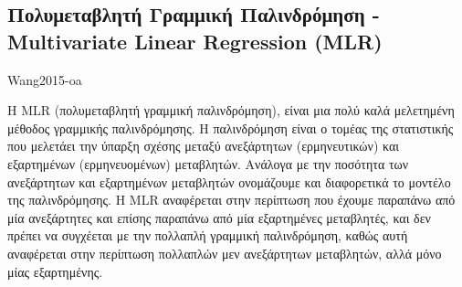 \documentclass[11pt,a4paper,english,greek,twoside]{../Thesis}
\begin{document}
\subsection{Πολυμεταβλητή Γραμμική Παλινδρόμηση - Multivariate Linear Regression (MLR)}
\cite{Wang2015-oa} Wang2015-oa
\par Η MLR (πολυμεταβλητή γραμμική παλινδρόμηση), είναι μια πολύ καλά μελετημένη μέθοδος γραμμικής παλινδρόμησης. Η παλινδρόμηση είναι ο τομέας της στατιστικής που μελετάει την ύπαρξη σχέσης μεταξύ ανεξάρτητων (ερμηνευτικών) και εξαρτημένων (ερμηνευομένων) μεταβλητών. Ανάλογα με την ποσότητα των ανεξάρτητων και εξαρτημένων μεταβλητών ονομάζουμε και διαφορετικά το μοντέλο της παλινδρόμησης. H MLR αναφέρεται στην περίπτωση που έχουμε παραπάνω από μία ανεξάρτητες και επίσης παραπάνω από μία εξαρτημένες μεταβλητές, και δεν πρέπει να συγχέεται με την πολλαπλή γραμμική παλινδρόμηση, καθώς αυτή αναφέρεται στην περίπτωση πολλαπλών μεν ανεξάρτητων μεταβλητών, αλλά μόνο μίας εξαρτημένης.
\end{document}
